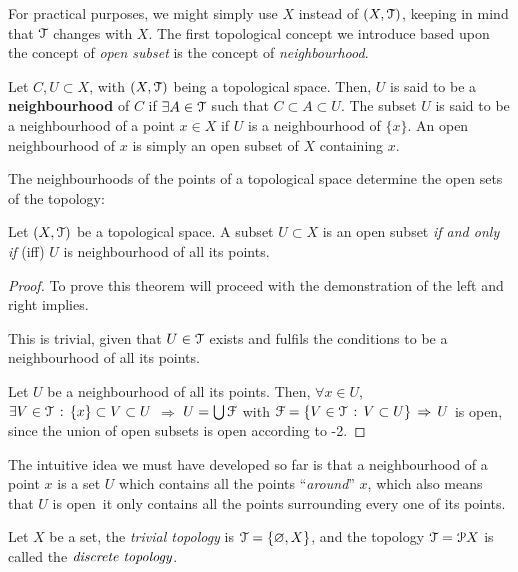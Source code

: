 For practical purposes, we might simply use $X$ instead of $(X, \EuScript{T})$, keeping in mind
that $\EuScript{T}$ changes with $X$.
The first topological concept we introduce based upon the concept of \emph{open subset} is
the concept of \emph{neighbourhood}.

\begin{definition}
	\label{def:neighbourhood}
	Let $C, U\subset X$, with $(X, \EuScript{T})$ being a topological space.
	Then, $U$ is said to
	be a \textbf{neighbourhood} of $C$ if $\exists A\in\EuScript{T}$ such that $C\subset A \subset U$.
	The subset $U$ is said to be a neighbourhood of a point $x\in X$ if $U$ is a
	neighbourhood of $\{x\}$.
	An open neighbourhood of $x$ is simply an open subset of $X$ containing $x$.
\end{definition}

The neighbourhoods of the points of a topological space determine the open sets of the topology:

\begin{theorem}
	Let $(X, \EuScript{T})$ be a topological space.
	A subset $U\subset X$ is an open subset \emph{if and only if} (iff) $U$ is neighbourhood of all its points.
\end{theorem}

\begin{proof} To prove this theorem will proceed with the demonstration of the left and
right implies.

\noindent{$\boxed{\Rightarrow}$} This is trivial, given that $U\in\EuScript{T}$ exists and
fulfils the conditions to be a neighbourhood of all its points.

\noindent{$\boxed{\Leftarrow}$} Let $U$ be a neighbourhood of all its points.
Then, $\forall x\in U$, $\exists V\in \EuScript{T}\,:\,\{x\}\subset V\subset U$ $\Rightarrow$
$U = \bigcup\EuScript{F}$ with $\EuScript{F}=\{V\in\EuScript{T}\,:\,V\subset U\}\,\Rightarrow\,U$ is open, since the union
of open subsets is open according to -2.
\end{proof}

The intuitive idea we must have developed so far is that a neighbourhood of a point $x$ is a set
$U$ which contains all the points ``\emph{around}'' $x$, which also means that $U$ is open
\iff\,it only contains all the points surrounding every one of its points.

\begin{example}
	Let $X$ be a set, the \emph{trivial topology} is $\EuScript{T}=\{\varnothing, X\}$, and the
	topology $\EuScript{T}=\EuScript{P} X$ is called the $\emph{discrete topology}$.
\end{example}

